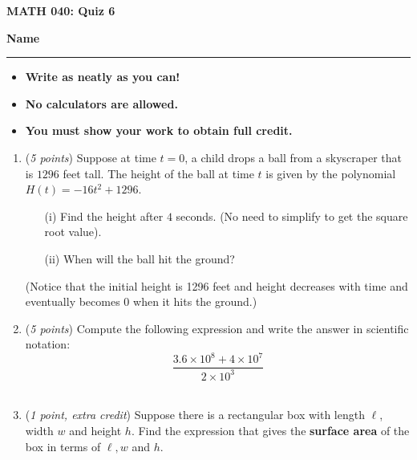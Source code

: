 \documentclass[12 pt]{article}
\begin{document}
  \begin{center}
    \textbf{\hfill MATH 040: Quiz 6} \\
  \end{center}
  \medskip

  \noindent
  \textbf{Name}\ \rule{3.5in}{.4pt} \hfill
  \vspace{.1in}
  \hspace*{0.2in}
  \begin{itemize}
    \item \textbf{Write as neatly as you can!}
    \item \textbf{No calculators are allowed.}
    \item \textbf{You must show your work to obtain full credit.}
  \end{itemize}

	\medskip
  \noindent

  \begin{enumerate}
    \item (\textit{5 points})
    Suppose at time $t=0$, a child drops a ball from a skyscraper that is $1296$ feet tall. The height of the ball at time $t$ is given by the polynomial $H(t) = -16t^2 + 1296$.
    \begin{enumerate}
      \item[(i)] Find the height after $4$ seconds. (No need to simplify to get the square root value).
      \item[(ii)] When will the ball hit the ground?
    \end{enumerate}
    (Notice that the initial height is 1296 feet and height decreases with time and eventually becomes $0$ when it hits the ground.)
		\pagebreak
		\item (\textit{5 points}) Compute the following expression and write the answer in scientific notation: \[ \frac{3.6 \times 10^8 + 4 \times 10^7}{2 \times 10^3} \]
    \vspace{3in}\\
    \item (\textit{1 point, extra credit})
    Suppose there is a rectangular box with length $\ell$, width $w$ and height $h$. Find the expression that gives the \textbf{surface area} of the box in terms of $\ell, w$ and $h$.
  \end{enumerate}
\end{document}
